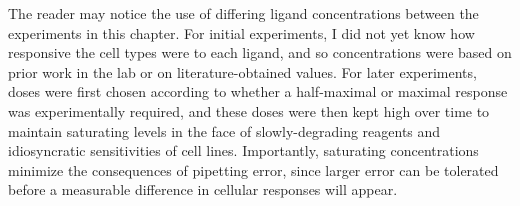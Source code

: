 The reader may notice the use of differing ligand concentrations between
the experiments in this chapter.
For initial experiments, I did not yet know how responsive the cell types were
to each ligand, and so concentrations were based on prior work in the lab or
on literature-obtained values. For later experiments, doses were first chosen
according to whether a half-maximal or maximal response was experimentally
required, and these doses were then kept high over time to maintain saturating
levels in the face of slowly-degrading reagents and idiosyncratic sensitivities
of cell lines. Importantly, saturating concentrations
minimize the consequences of pipetting
error, since larger error can be tolerated before a measurable difference
in cellular responses will appear.

